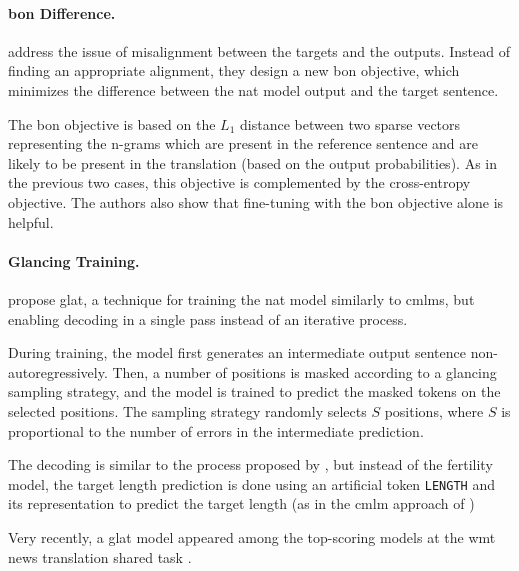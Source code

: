 \paragraph{\Acl{bon} Difference.} \citet{shao2020minimizing} address the
issue of misalignment between the targets and the outputs. Instead of finding
an appropriate alignment, they design a new \acf{bon} objective,
which minimizes the difference between the \ac{nat} model output and the target
sentence.

The \ac{bon} objective is based on the $L_1$ distance between two sparse
vectors representing the n-grams which are present in the reference sentence
and are likely to be present in the translation (based on the output
probabilities). As in the previous two cases, this objective is complemented by
the cross-entropy objective. The authors also show that fine-tuning with the
\ac{bon} objective alone is helpful.

\paragraph{Glancing Training.} \citet{qian-etal-2021-glancing} propose
\acf{glat}, a technique for training the \ac{nat} model
similarly to \acp{cmlm}, but enabling decoding in a single pass instead of an
iterative process.

During training, the model first generates an intermediate output sentence
non-autoregressively. Then, a number of positions is masked according to a
glancing sampling strategy, and the model is trained to predict the masked
tokens on the selected positions. The sampling strategy randomly selects $S$
positions, where $S$ is proportional to the number of errors in the
intermediate prediction.

The decoding is similar to the process proposed by
\citet{gu2017nonautoregressive}, but instead of the fertility model, the target
length prediction is done using an artificial token \texttt{LENGTH} and its
representation to predict the target length (as in the \ac{cmlm} approach of
\citealp{ghazvininejad-etal-2019-mask})

Very recently, a \ac{glat} model appeared among the top-scoring models at the
\acs{wmt} news translation shared task \citep{qian2021volctrans}. 


